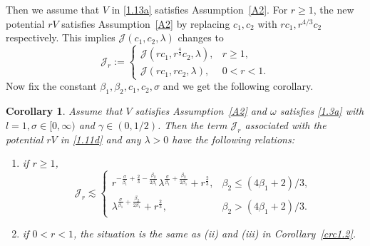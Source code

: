 \documentclass{article}
\numberwithin{equation}{section}
\newtheorem{corollary}[theorem]{Corollary}
\numberwithin{equation}{section}
\theoremstyle{definition}
\begin{document}
Then we assume that $V$ in \eqref{1.13a} satisfies Assumption~\ref{A2}. For $r\ge 1$, the new potential $rV$ satisfies Assumption~\ref{A2} by replacing $c_1,c_2$ with $rc_1,r^{4 /3}c_2$ respectively. This implies $\mathcal{J}(c_1,c_2,\lambda)$ changes to 
\begin{equation}
	\mathcal{J}_r:=\begin{cases}
		\mathcal{J}(rc_1,r^{\frac{4}{3}}c_2,\lambda),&r\ge 1,\\
		\mathcal{J}(rc_1,rc_2,\lambda),&0<r<1.
	\end{cases}
\end{equation}
Now fix the constant $\beta_1,\beta_2,c_1,c_2,\sigma $ and we get the following corollary.
\begin{corollary}\label{crc1.3h}
	Assume that $V$ satisfies Assumption~\ref{A2} and $\omega$ satisfies \eqref{1.3a} with $l=1,\sigma \in [0,\infty)$ and $\gamma \in (0,1 /2)$. Then the term $\mathcal{J}_r$ associated with the potential $rV$ in \eqref{1.11d} and any $\lambda>0$ have the following relations:
	\begin{enumerate}
		\item if $r\ge 1$, 
			\begin{equation}
				\mathcal{J}_r\lesssim \begin{cases}				
					r^{-\frac{\sigma }{\beta_1}+\frac{2}{3}-\frac{\beta_2}{2\beta_1}}\lambda^{\frac{\sigma }{\beta_1}+\frac{\beta_2}{2\beta_1}}+r^{\frac{2}{3}},& \beta_2\le (4\beta_1+2) /3,\\
					 \lambda^{\frac{\sigma }{\beta_1}+\frac{\beta_2}{2\beta_1}}+r^{\frac{2}{3}},& \beta_2>(4\beta_1+2) /3.	
				\end{cases}
			\end{equation}
		\item if  $0<r<1$, the situation is the same as {\rm (ii)} and {\rm (iii)} in Corollary~\ref{crc1.2}.
	\end{enumerate}
\end{corollary}
\end{document}
